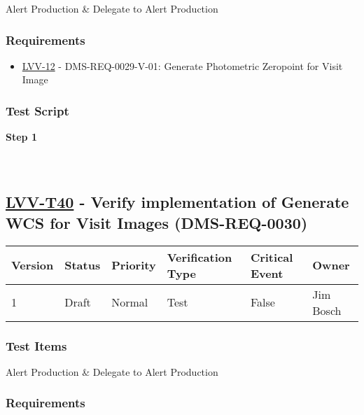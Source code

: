 Alert Production \& Delegate to Alert Production

\hypertarget{requirements-16}{%
\subsubsection{Requirements}\label{requirements-16}}

\begin{itemize}
\tightlist
\item
  \href{https://jira.lsstcorp.org/browse/LVV-12}{LVV-12} -
  DMS-REQ-0029-V-01: Generate Photometric Zeropoint for Visit Image
\end{itemize}

\hypertarget{test-script-16}{%
\subsubsection{Test Script}\label{test-script-16}}

\textbf{Step 1}\\
~\\
~\\

\hypertarget{lvv-t40---verify-implementation-of-generate-wcs-for-visit-images-dms-req-0030}{%
\subsection{\texorpdfstring{\href{https://jira.lsstcorp.org/secure/Tests.jspa\#/testCase/LVV-T40}{LVV-T40}
- Verify implementation of Generate WCS for Visit Images
(DMS-REQ-0030)}{LVV-T40 - Verify implementation of Generate WCS for Visit Images (DMS-REQ-0030)}}\label{lvv-t40---verify-implementation-of-generate-wcs-for-visit-images-dms-req-0030}}

\begin{longtable}[]{@{}llllll@{}}
\toprule
Version & Status & Priority & Verification Type & Critical Event &
Owner\tabularnewline
\midrule
\endhead
1 & Draft & Normal & Test & False & Jim Bosch\tabularnewline
\bottomrule
\end{longtable}

\hypertarget{test-items-16}{%
\subsubsection{Test Items}\label{test-items-16}}

Alert Production \& Delegate to Alert Production

\hypertarget{requirements-17}{%
\subsubsection{Requirements}\label{requirements-17}}

